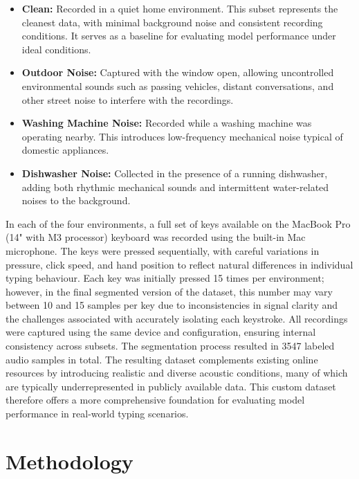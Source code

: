 \documentclass[a4paper,11pt,twoside]{report}
\theoremstyle{definition}
\begin{document}
\begin{itemize}
    \item \textbf{Clean:} Recorded in a quiet home environment. This subset represents the cleanest data, with minimal background noise and consistent recording conditions. It serves as a baseline for evaluating model performance under ideal conditions.

    \item \textbf{Outdoor Noise:} Captured with the window open, allowing uncontrolled environmental sounds such as passing vehicles, distant conversations, and other street noise to interfere with the recordings.

    \item \textbf{Washing Machine Noise:} Recorded while a washing machine was operating nearby. This introduces low-frequency mechanical noise typical of domestic appliances.

    \item \textbf{Dishwasher Noise:} Collected in the presence of a running dishwasher, adding both rhythmic mechanical sounds and intermittent water-related noises to the background.
\end{itemize}

In each of the four environments, a full set of keys available on the MacBook Pro (14" with M3 processor) keyboard was recorded using the built-in Mac microphone. The keys were pressed sequentially, with careful variations in pressure, click speed, and hand position to reflect natural differences in individual typing behaviour. Each key was initially pressed 15 times per environment; however, in the final segmented version of the dataset, this number may vary between 10 and 15 samples per key due to inconsistencies in signal clarity and the challenges associated with accurately isolating each keystroke. All recordings were captured using the same device and configuration, ensuring internal consistency across subsets. The segmentation process resulted in 3547 labeled audio samples in total. The resulting dataset complements existing online resources by introducing realistic and diverse acoustic conditions, many of which are typically underrepresented in publicly available data. This custom dataset therefore offers a more comprehensive foundation for evaluating model performance in real-world typing scenarios.



\chapter{Methodology}
\end{document}
